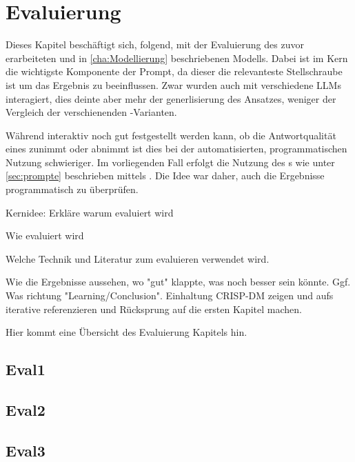 
\chapter{Evaluierung}
\label{cha:eval}

Dieses Kapitel beschäftigt sich,  folgend, mit der Evaluierung des zuvor erarbeiteten und in \autoref{cha:Modellierung} beschriebenen Modells. Dabei ist im Kern die wichtigste Komponente der Prompt, da dieser die relevanteste Stellschraube ist um das Ergebnis zu beeinflussen. Zwar wurden auch mit verschiedene LLMs interagiert, dies deinte aber mehr der generlisierung des Ansatzes, weniger der Vergleich der verschienenden -Varianten.

Während interaktiv noch gut festgestellt werden kann, ob die Antwortqualität eines  zunimmt oder abnimmt ist dies bei der automatisierten, programmatischen Nutzung schwieriger. Im vorliegenden Fall erfolgt die Nutzung des s wie unter \autoref{sec:prompte} beschrieben mittels . Die Idee war daher, auch die Ergebnisse programmatisch zu überprüfen.

Kernidee: Erkläre warum evaluiert wird

Wie evaluiert wird

Welche Technik und Literatur zum evaluieren verwendet wird.

Wie die Ergebnisse aussehen, wo "gut" klappte, was noch besser sein könnte. Ggf. Was richtung "Learning/Conclusion". Einhaltung CRISP-DM zeigen und aufs iterative referenzieren und Rücksprung auf die ersten Kapitel machen.

Hier kommt eine Übersicht des Evaluierung Kapitels hin.

\section{Eval1}
\label{sec:abschnitt3.1}

\section{Eval2}

\section{Eval3}